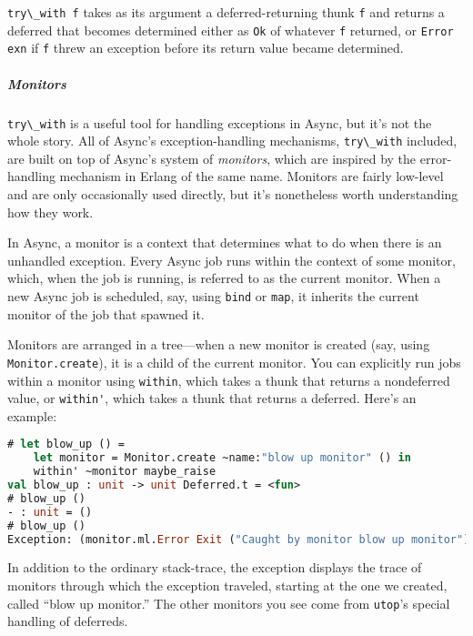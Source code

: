 \passthrough{\lstinline!try\_with f!} takes as its argument a
deferred-returning thunk \passthrough{\lstinline!f!} and returns a
deferred that becomes determined either as \passthrough{\lstinline!Ok!}
of whatever \passthrough{\lstinline!f!} returned, or
\passthrough{\lstinline!Error exn!} if \passthrough{\lstinline!f!} threw
an exception before its return value became determined.

\hypertarget{monitors}{%
\subparagraph{Monitors}\label{monitors}}

\passthrough{\lstinline!try\_with!} is a useful tool for handling
exceptions in Async, but it's not the whole story. All of Async's
exception-handling mechanisms, \passthrough{\lstinline!try\_with!}
included, are built on top of Async's system of \emph{monitors}, which
are inspired by the error-handling mechanism in Erlang of the same name.
Monitors are fairly low-level and are only occasionally used directly,
but it's nonetheless worth understanding how they work. 

In Async, a monitor is a context that determines what to do when there
is an unhandled exception. Every Async job runs within the context of
some monitor, which, when the job is running, is referred to as the
current monitor. When a new Async job is scheduled, say, using
\passthrough{\lstinline!bind!} or \passthrough{\lstinline!map!}, it
inherits the current monitor of the job that spawned it.

Monitors are arranged in a tree---when a new monitor is created (say,
using \passthrough{\lstinline!Monitor.create!}), it is a child of the
current monitor. You can explicitly run jobs within a monitor using
\passthrough{\lstinline!within!}, which takes a thunk that returns a
nondeferred value, or \passthrough{\lstinline!within'!}, which takes a
thunk that returns a deferred. Here's an example:

\begin{lstlisting}[language=Caml]
# let blow_up () =
    let monitor = Monitor.create ~name:"blow up monitor" () in
    within' ~monitor maybe_raise
val blow_up : unit -> unit Deferred.t = <fun>
# blow_up ()
- : unit = ()
# blow_up ()
Exception: (monitor.ml.Error Exit ("Caught by monitor blow up monitor"))
\end{lstlisting}

In addition to the ordinary stack-trace, the exception displays the
trace of monitors through which the exception traveled, starting at the
one we created, called ``blow up monitor.'' The other monitors you see
come from \passthrough{\lstinline!utop!}'s special handling of
deferreds.

